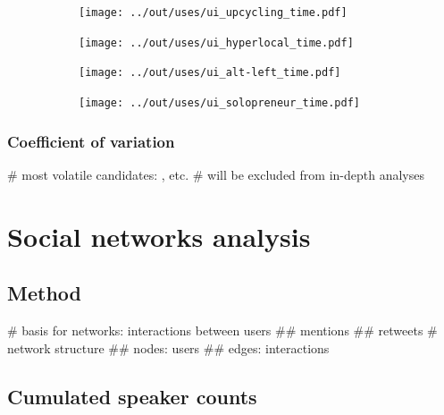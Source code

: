 \documentclass[a4paper]{scrartcl}
\begin{document}
    \begin{figure}
      \caption{Temporal dynamics in usage frequency for case studies.}
      \centering
      \begin{subfigure}{.45\linewidth}
        \caption{}
        \texttt{[image: ../out/uses/ui\_upcycling\_time.pdf]}
      \end{subfigure}
      \begin{subfigure}{.45\linewidth}
        \caption{}
        \texttt{[image: ../out/uses/ui\_hyperlocal\_time.pdf]}
      \end{subfigure}
      \begin{subfigure}{.45\linewidth}
        \caption{}
        \texttt{[image: ../out/uses/ui\_alt-left\_time.pdf]}
      \end{subfigure}
      \begin{subfigure}{.45\linewidth}
        \caption{}
        \texttt{[image: ../out/uses/ui\_solopreneur\_time.pdf]}
      \end{subfigure}
    \end{figure}

    \subsubsection{Coefficient of variation}

      \begin{easylist}[itemize]
        # most volatile candidates: ,  etc.
        # will be excluded from in-depth analyses
      \end{easylist}

\section{Social networks analysis}

  \subsection{Method}

    \begin{easylist}[itemize]
      # basis for networks: interactions between users
        ## mentions
        ## retweets
      # network structure
        ## nodes: users
        ## edges: interactions
    \end{easylist}

  \subsection{Cumulated speaker counts}
\end{document}
